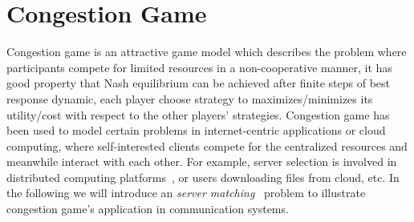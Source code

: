 






\section{Congestion Game}
\label{congsetion_game}




Congestion game is an attractive game model which describes the problem where participants compete for limited resources in a non-cooperative manner, it has good property that Nash equilibrium can be achieved after finite steps of best response dynamic, \ie each player choose strategy to maximizes/minimizes its utility/cost with respect to the other players' strategies.
Congestion game has been used to model certain problems in internet-centric applications or cloud computing, where self-interested clients compete for the centralized resources and meanwhile interact with each other.
For example, server selection is involved in distributed computing platforms~\cite{Cloud_Computing_2010}, or users downloading files from cloud, etc.
In the following we will introduce an \textit{server matching}~\cite{kothari:congestion_serverMatching} problem to illustrate congestion game's application in communication systems.

